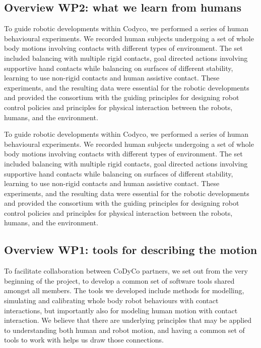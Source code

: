 \documentclass[12pt,a4paper,twoside]{article}
\begin{document}
\subsection{Overview WP2: what we learn from humans }

To guide robotic developments within Codyco, we performed a series of human behavioural experiments. We recorded human subjects undergoing a set of whole body motions involving contacts with different types of environment. The set included balancing with multiple rigid contacts, goal directed actions involving supportive hand contacts while balancing on surfaces of different stability, learning to use non-rigid contacts and human assistive contact. These experiments, and the resulting data were essential for the robotic developments and provided the consortium with the guiding principles for designing robot control policies and principles for physical interaction between the robots, humans, and the environment.

To guide robotic developments within Codyco, we performed a series of human behavioural experiments. 
We recorded human subjects undergoing a set of whole body motions involving contacts with different types of environment. The set included balancing with multiple rigid contacts, 
goal directed actions involving supportive hand contacts while balancing on surfaces of different stability, learning to use non-rigid contacts and human assistive contact. These experiments, and the resulting data were essential for the robotic developments 
and provided the consortium with the guiding principles for designing robot control policies 
and principles for physical interaction between the robots, humans, and the environment. 


\subsection{Overview WP1: tools for describing the motion}
To facilitate collaboration between CoDyCo partners, we set out from the very beginning of the project, to develop a common set of software tools shared amongst all members.  The tools we developed include methods for modelling, simulating and calibrating whole body robot behaviours with contact interactions, but importantly also for modeling human motion with contact interaction. We believe that there are underlying principles that may be applied to understanding both human and robot motion, and having a common set of tools to work with helps us draw those connections.   
\end{document}

